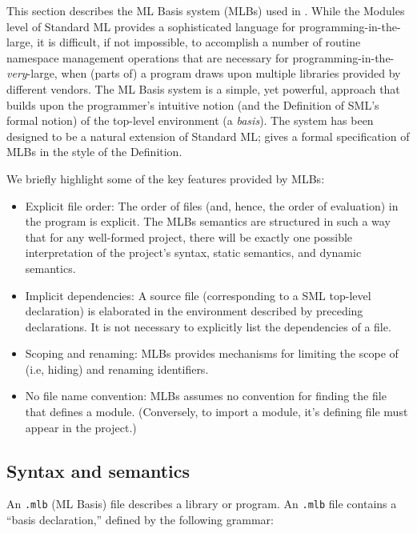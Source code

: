 %
This section describes the ML Basis system (MLBs) used in {\mlton}.
While the Modules level of Standard ML provides a sophisticated
language for programming-in-the-large, it is difficult, if not
impossible, to accomplish a number of routine namespace management
operations that are necessary for
programming-in-the-\emph{very}-large, when (parts of) a program draws
upon multiple libraries provided by different vendors.  The ML Basis
system is a simple, yet powerful, approach that builds upon the
programmer's intuitive notion (and the Definition of SML's formal
notion) of the top-level environment (a \emph{basis}).  The system has
been designed to be a natural extension of Standard ML;
 gives a formal specification of MLBs in the
style of the Definition.

We briefly highlight some of the key features provided by MLBs:
\begin{itemize}
\item Explicit file order: The order of files (and, hence, the order
  of evaluation) in the program is explicit.  The MLBs semantics are
  structured in such a way that for any well-formed project, there
  will be exactly one possible interpretation of the project's syntax,
  static semantics, and dynamic semantics.
\item Implicit dependencies: A source file (corresponding to a SML
  top-level declaration) is elaborated in the environment described by
  preceding declarations.  It is not necessary to explicitly list the
  dependencies of a file.
\item Scoping and renaming: MLBs provides mechanisms for limiting the
  scope of (i.e, hiding) and renaming identifiers.
\item No file name convention: MLBs assumes no convention for finding
  the file that defines a module.  (Conversely, to import a module,
  it's defining file must appear in the project.)
\end{itemize}

%
\subsection{Syntax and semantics}

An {\tt .mlb} (ML Basis) file describes a library or program.  An
{\tt .mlb} file contains a ``basis declaration,'' defined by the
following grammar:

